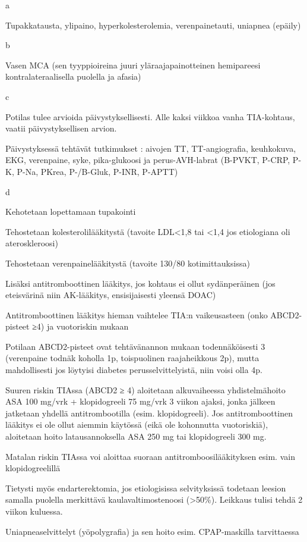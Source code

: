 \documentclass[
]{book}
\begin{document}
a

Tupakkatausta, ylipaino, hyperkolesterolemia, verenpainetauti, uniapnea (epäily)

b

Vasen MCA (sen tyyppioireina juuri yläraajapainotteinen hemipareesi kontralateraalisella puolella ja afasia)

c

Potilas tulee arvioida päivystyksellisesti. Alle kaksi viikkoa vanha TIA-kohtaus, vaatii päivystyksellisen arvion.

Päivystyksessä tehtävät tutkimukset : aivojen TT, TT-angiografia, keuhkokuva, EKG, verenpaine, syke, pika-glukoosi ja perus-AVH-labrat (B-PVKT, P-CRP, P-K, P-Na, PKrea, P-/B-Gluk, P-INR, P-APTT)

d

Kehotetaan lopettamaan tupakointi

Tehostetaan kolesterolilääkitystä (tavoite LDL\textless1,8 tai \textless1,4 jos etiologiana oli ateroskleroosi)

Tehostetaan verenpainelääkitystä (tavoite 130/80 kotimittauksissa)

Lisäksi antitromboottinen lääkitys, jos kohtaus ei ollut sydänperäinen (jos eteisvärinä niin AK-lääkitys, ensisijaisesti yleensä DOAC)

Antitromboottinen lääkitys hieman vaihtelee TIA:n vaikeusasteen (onko ABCD2-pisteet ≥4) ja vuotoriskin mukaan

Potilaan ABCD2-pisteet ovat tehtävänannon mukaan todennäköisesti 3 (verenpaine todnäk koholla 1p, toispuolinen raajaheikkous 2p), mutta mahdollisesti jos löytyisi diabetes perusselvittelyistä, niin voisi olla 4p.

Suuren riskin TIAssa (ABCD2 ≥ 4) aloitetaan alkuvaiheessa yhdistelmähoito ASA 100 mg/vrk + klopidogreeli 75 mg/vrk 3 viikon ajaksi, jonka jälkeen jatketaan yhdellä antitrombootilla (esim. klopidogreeli). Jos antitromboottinen lääkitys ei ole ollut aiemmin käytössä (eikä ole kohonnutta vuotoriskiä), aloitetaan hoito latausannoksella ASA 250 mg tai klopidogreeli 300 mg.

Matalan riskin TIAssa voi aloittaa suoraan antitromboosilääkityksen esim. vain klopidogreelillä

Tietysti myös endarterektomia, jos etiologisissa selvityksissä todetaan leesion samalla puolella merkittävä kaulavaltimostenoosi (\textgreater50\%). Leikkaus tulisi tehdä 2 viikon kuluessa.

Uniapneaselvittelyt (yöpolygrafia) ja sen hoito esim. CPAP-maskilla tarvittaessa
\end{document}
